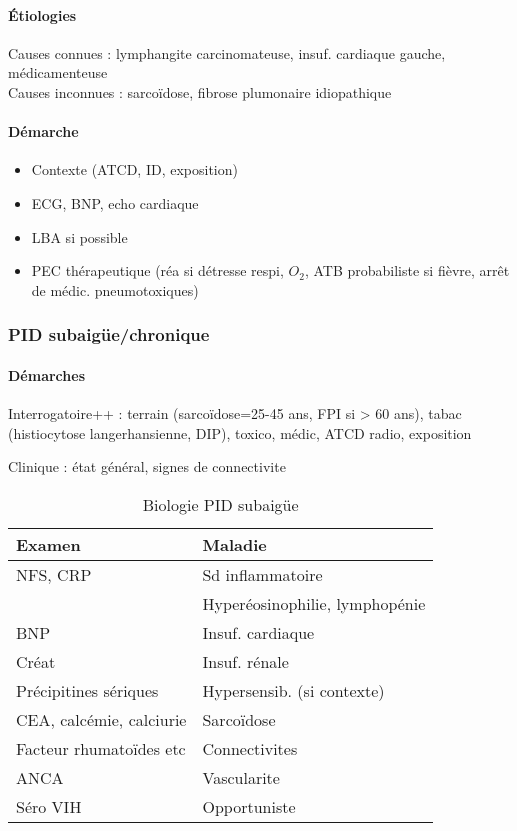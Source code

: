\documentclass[11pt]{article}
\begin{document}
\paragraph{Étiologies}
\label{sec:org24942f7}
Causes connues : lymphangite carcinomateuse, insuf. cardiaque gauche, médicamenteuse\\
Causes inconnues : sarcoïdose, fibrose plumonaire idiopathique
\paragraph{Démarche}
\label{sec:org5e0ab6b}

\begin{itemize}
\item Contexte (ATCD, ID, exposition)
\item ECG, BNP, echo cardiaque
\item LBA si possible
\item PEC thérapeutique (réa si détresse respi, \(O_2\), ATB probabiliste si fièvre, arrêt de médic. pneumotoxiques)
\end{itemize}


\subsubsection{PID subaigüe/chronique}
\label{sec:orgd42ed33}
\paragraph{Démarches}
\label{sec:org192e3ee}
Interrogatoire++ : terrain (sarcoïdose=25-45 ans, \gls{FPI} si > 60 ans), tabac (histiocytose langerhansienne, \gls{DIP}), toxico, médic, ATCD radio, exposition

Clinique : état général, signes de connectivite

\begin{table}[htbp]
  \caption{Biologie PID subaigüe}
  \centering
  \begin{tabular}{ll}
    \toprule
    Examen & Maladie\\
    \midrule
    NFS, CRP & Sd inflammatoire\\
           & Hyperéosinophilie, lymphopénie\\
    BNP & Insuf. cardiaque\\
    Créat & Insuf. rénale\\
    Précipitines sériques & Hypersensib. (si contexte)\\
    CEA, calcémie, calciurie & Sarcoïdose\\
    Facteur rhumatoïdes etc & Connectivites\\
    ANCA & Vascularite\\
    Séro VIH & Opportuniste\\
    \bottomrule
  \end{tabular}
\end{table}
\end{document}
